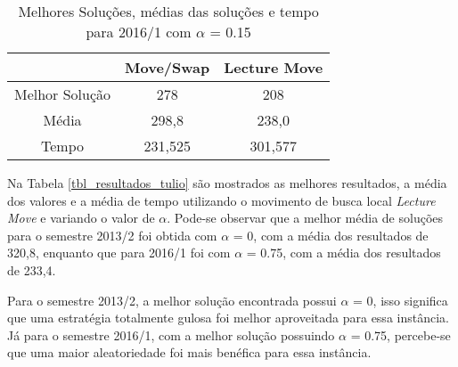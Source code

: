 \begin{table}[!htbp]
\centering
\begin{tabular}{|c|c|c|}
\hline
 & Move/Swap & Lecture Move \\ \hline
Melhor Solução & 278 & 208 \\ \hline
Média & 298,8 & 238,0 \\ \hline
Tempo & 231,525 & 301,577 \\ \hline
\end{tabular}
\caption{Melhores Soluções, médias das soluções e tempo para 2016/1 com \(\alpha\) = 0.15}
\label{tbl_resultados_alfa152016}
\end{table}


Na Tabela \ref{tbl_resultados_tulio} são mostrados as melhores resultados, a média dos valores e a média de tempo utilizando o movimento de busca local \textit{Lecture Move} e variando o valor de \(\alpha\). Pode-se observar que a melhor média de soluções para o semestre 2013/2 foi obtida com \(\alpha\) = 0, com a média dos resultados de 320,8, enquanto que para 2016/1 foi com \(\alpha\) = 0.75, com a média dos resultados de 233,4.

Para o semestre 2013/2, a melhor solução encontrada possui  \(\alpha\) = 0, isso significa que uma estratégia totalmente gulosa foi melhor aproveitada para essa instância.
Já para o semestre 2016/1, com a melhor solução possuindo  \(\alpha\) = 0.75, percebe-se que uma maior aleatoriedade foi mais benéfica para essa instância.

